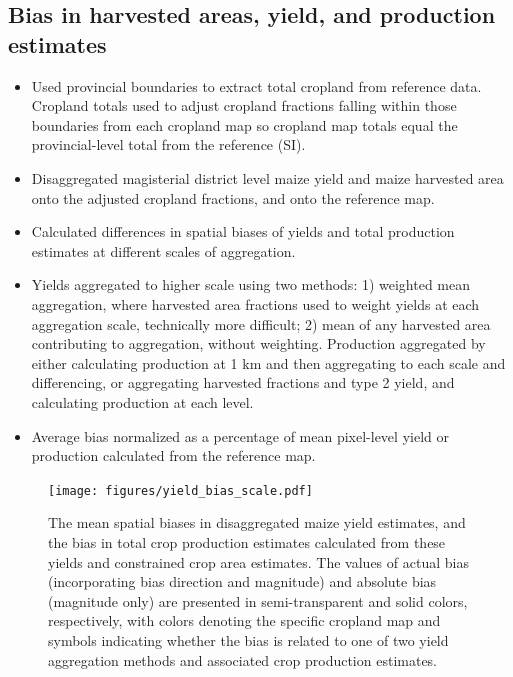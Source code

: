 \documentclass{pnastwo}
\begin{document}
\begin{article}
\subsection{Bias in harvested areas, yield, and production estimates}

\begin{itemize}
  \item Used provincial boundaries to extract total cropland from reference data. Cropland totals used to adjust cropland fractions falling within those boundaries from each cropland map so cropland map totals equal the provincial-level total from the reference (SI). 
  \item Disaggregated magisterial district level maize yield and maize harvested area onto the adjusted cropland fractions, and onto the reference map.
  \item Calculated differences in spatial biases of yields and total production estimates at different scales of aggregation. 
  \item Yields aggregated to higher scale using two methods: 1) weighted mean aggregation, where harvested area fractions used to weight yields at each aggregation scale, technically more difficult; 2) mean of any harvested area contributing to aggregation, without weighting. Production aggregated by either calculating production at 1 km and then aggregating to each scale and differencing, or aggregating harvested fractions and type 2 yield, and calculating production at each level.
  \item Average bias normalized as a percentage of mean pixel-level yield or production calculated from the reference map.   
 \end{itemize}


\vspace{-1 cm}
\begin{figure}[ht]
\centerline{\texttt{[image: figures/yield\_bias\_scale.pdf]}}
\caption{The mean spatial biases in disaggregated maize yield estimates, and the bias in total crop production estimates calculated from these yields and constrained crop area estimates. The values of actual bias (incorporating bias direction and magnitude) and absolute bias (magnitude only) are presented in semi-transparent and solid colors, respectively, with colors denoting the specific cropland map and symbols indicating whether the bias is related to one of two yield aggregation methods and associated crop production estimates.}
\label{afoto}
\end{figure}


\end{article}
\end{document}
